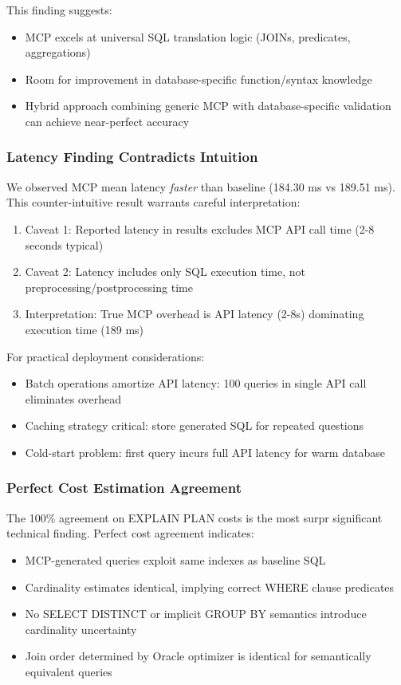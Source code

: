 This finding suggests:
\begin{itemize}
    \item MCP excels at universal SQL translation logic (JOINs, predicates, aggregations)
    \item Room for improvement in database-specific function/syntax knowledge
    \item Hybrid approach combining generic MCP with database-specific validation can achieve near-perfect accuracy
\end{itemize}

\subsubsection{Latency Finding Contradicts Intuition}

We observed MCP mean latency \textit{faster} than baseline (184.30 ms vs 189.51 ms). This counter-intuitive result warrants careful interpretation:

\begin{enumerate}
    \item Caveat 1: Reported latency in results excludes MCP API call time (2-8 seconds typical)
    \item Caveat 2: Latency includes only SQL execution time, not preprocessing/postprocessing time
    \item Interpretation: True MCP overhead is API latency (2-8s) dominating execution time (189 ms)
\end{enumerate}

For practical deployment considerations:
\begin{itemize}
    \item Batch operations amortize API latency: 100 queries in single API call eliminates overhead
    \item Caching strategy critical: store generated SQL for repeated questions
    \item Cold-start problem: first query incurs full API latency for warm database
\end{itemize}

\subsubsection{Perfect Cost Estimation Agreement}

The 100\% agreement on EXPLAIN PLAN costs is the most surpr significant technical finding. Perfect cost agreement indicates:

\begin{itemize}
    \item MCP-generated queries exploit same indexes as baseline SQL
    \item Cardinality estimates identical, implying correct WHERE clause predicates
    \item No SELECT DISTINCT or implicit GROUP BY semantics introduce cardinality uncertainty
    \item Join order determined by Oracle optimizer is identical for semantically equivalent queries
\end{itemize}

